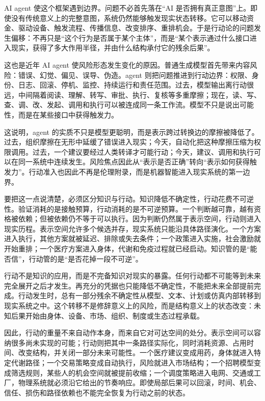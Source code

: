AI agent 使这个框架遇到边界。问题不必首先落在“AI 是否拥有真正意图”上。即使没有传统意义上的完整意图，系统仍然能够触发现实状态转移。它可以移动资金、驱动设备、触发流程、传播信息、改变排序、重排机会。于是行动论的问题发生偏移：不再只是“这个行为是否属于某个主体”，而是“某个表示通过什么接口进入现实，获得了多大作用半径，并由什么结构承付它的残余后果”。

这也是近年 AI agent 使风险形态发生变化的原因。普通生成模型首先带来内容风险：错误、幻觉、偏见、误导、伪造。agent 则把问题推进到行动边界：权限、身份、日志、回滚、停机、监控、持续运行和责任范围\cite{openai2025chatgptagentsystemcard}。过去，模型输出离行动很远，中间隔着阅读、理解、转写、审批、执行、复核等多重摩擦；现在，读、写、查、调、改、发起、调用和执行可以被连成同一条工作流。模型不只是说出可能性，而是在某些接口中获得触发力。

这说明，agent 的实质不只是模型更聪明，而是表示跨过转换边的摩擦被降低了。过去，组织摩擦在无形中延缓了错误进入现实；今天，自动化把这种摩擦压缩为权限调用。过去，一个建议要经过人类转译才可能行动；今天，建议、调用和执行可以在同一系统中连续发生。风险焦点因此从“表示是否正确”转向“表示如何获得触发力”。行动准入也因此不再是伦理附录，而是机器智能进入现实系统的第一边界。


要把这一点说清楚，必须区分知识与行动。知识降低不确定性，行动花费不可逆性。验证消耗的是接触预算，行动消耗的是不可逆预算。一个判断越可靠，越有资格被依赖；但被依赖仍不等于可以执行。因为判断仍然属于表示空间，行动则进入现实历程。表示空间允许多个候选并存，现实系统只能沿具体路径演化。一个方案进入执行，其他方案就被延迟、排除或失去条件；一个政策进入实施，社会激励就开始重排；一个医疗方案进入身体，代谢和免疫过程就已经启动。知识管的是“能否信”，行动管的是“是否花掉一段不可逆”。

行动不是知识的应用，而是不完备知识对现实的暴露。任何行动都不可能等到未来完全展开之后才发生。再充分的凭据也只能降低不确定性，不能把未来全部提前完成。行动发生时，总有一部分残余不确定性从模型、文本、计划或仿真内部转移到现实系统之中。这个转移不是修辞意义上的风险，而是结构意义上的状态改变：未知后果开始由身体、设备、市场、组织、制度或生态过程承载。

因此，行动的重量不来自动作本身，而来自它对可达空间的处分。表示空间可以容纳很多尚未实现的可能；行动则把其中一条路径实际化，同时消耗资源、占用时间、改变结构，并关闭一部分未来可能性。一个医疗建议变成用药，身体就进入特定代谢路径；一个交易策略变成自动执行，风险就进入市场结构；一个招聘模型变成筛选规则，某些人的机会空间就被提前收缩；一个调度策略进入电网、交通或工厂，物理系统就必须沿它给出的节奏响应。即使局部后果可以回滚，时间、机会、信任、损伤和路径依赖也不能完全恢复为行动之前的状态。

